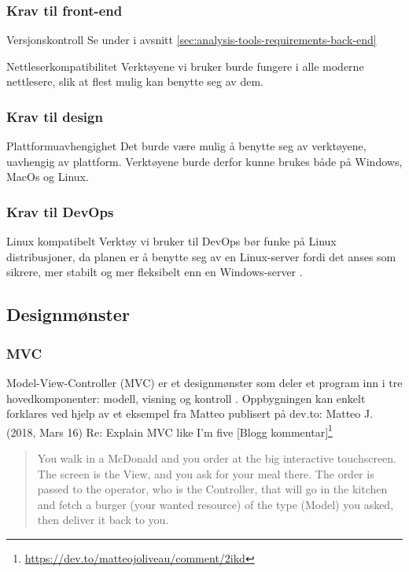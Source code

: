 \subsubsection{Krav til front-end}
\begin{compactdesc}
\item [Versjonskontroll] Se  under  i avsnitt \ref{sec:analysis-tools-requirements-back-end}
\item [Nettleserkompatibilitet] Verktøyene vi bruker burde fungere i alle moderne nettlesere, slik at flest mulig kan benytte seg av dem.
\end{compactdesc}

\subsubsection{Krav til design}
\begin{compactdesc}
\item [Plattformuavhengighet] Det burde være mulig å benytte seg av verktøyene, uavhengig av plattform. Verktøyene burde derfor kunne brukes både på Windows, MacOs og Linux.
\end{compactdesc}

\subsubsection{Krav til DevOps}
\begin{compactdesc}
\item [Linux kompatibelt] Verktøy vi bruker til DevOps bør funke på Linux distribusjoner, da planen er å benytte seg av en Linux-server fordi det anses som sikrere, mer stabilt og mer fleksibelt enn en Windows-server \cite{cabrera2009windows}.
\end{compactdesc}

\subsection{Designmønster}

\subsubsection{MVC}
\label{sec:tools-mvc}
Model-View-Controller (MVC)\cite{burbeck87aps} er et designmønster som deler et program inn i tre hovedkomponenter: modell, visning og kontroll \cite{burbeck87aps}. Oppbygningen kan enkelt forklares ved hjelp av et eksempel fra Matteo publisert på dev.to:
Matteo J. (2018, Mars 16) Re: Explain MVC like I'm five [Blogg kommentar]\footnote{\url{https://dev.to/matteojoliveau/comment/2ikd}}
\begin{quote}
    You walk in a McDonald and you order at the big interactive touchscreen.
    The screen is the View, and you ask for your meal there.
    The order is passed to the operator, who is the Controller, that will go in the kitchen and fetch a burger (your wanted resource) of the type (Model) you asked, then deliver it back to you.
\end{quote}

